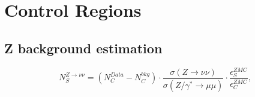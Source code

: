 \section{Control Regions}



\subsection{Z background estimation}


\begin{equation}
  N_{S}^{Z\rightarrow\nu\nu}=\left(N_{C}^{Data}-N_{C}^{bkg}\right) \cdot\frac{\sigma\left(Z\rightarrow\nu\nu\right)}{\sigma\left(Z/\gamma^{*}\rightarrow\mu\mu\right)}\cdot \frac{\epsilon_{S}^{ZMC}}{\epsilon_{C}^{ZMC}},
\label{eq:mumueq}
\end{equation}

